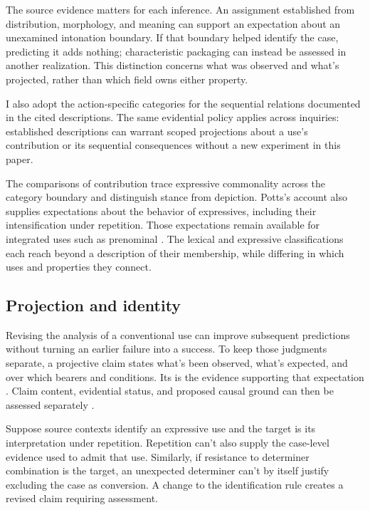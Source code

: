 \documentclass[12pt]{article}
\begin{document}
The source evidence matters for each inference. An assignment established
from distribution, morphology, and meaning can support an expectation about
an unexamined intonation boundary. If that boundary helped identify the case, predicting it
adds nothing; characteristic packaging can instead be assessed in another
realization. This distinction concerns what was observed and what's
projected, rather than which field owns either property.

I also adopt the action-specific categories for the sequential relations
documented in the cited descriptions. The same evidential policy applies
across inquiries: established descriptions can warrant scoped projections
about a use's contribution or its sequential consequences without a new
experiment in this paper.

The comparisons of contribution trace expressive commonality across the
category boundary and distinguish stance from depiction. Potts's account also
supplies expectations about the behavior of expressives, including their
intensification under repetition. Those expectations remain available for
integrated uses such as prenominal . The lexical and
expressive classifications each reach beyond a description of their
membership, while differing in which uses and properties they connect.

\subsection{Projection and identity}

Revising the analysis of a conventional use can improve subsequent
predictions without turning an earlier failure into a success. To
keep those judgments separate, a projective claim states what's been
observed, what's expected, and over which bearers and conditions.
Its  is the evidence supporting that expectation
\citep{Goodman1955}. Claim content, evidential status, and proposed causal
ground can then be assessed separately
\citep[11--12]{reynolds2026projectibilityHistory}.

Suppose source contexts identify an expressive use and the target is
its interpretation under repetition. Repetition can't also supply the
case-level evidence used to admit that use. Similarly, if resistance
to determiner combination is the target, an unexpected determiner
can't by itself justify excluding the case as conversion. A change
to the identification rule creates a revised claim requiring assessment.
\end{document}

